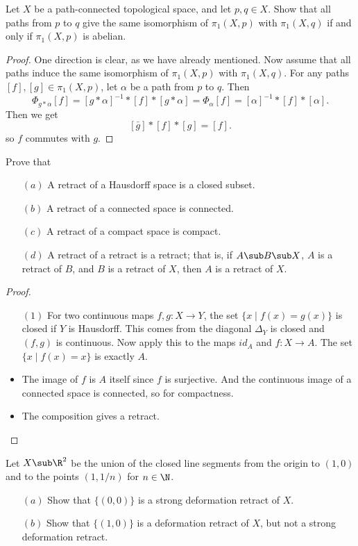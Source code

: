 \begin{exercise}
Let $X$ be a path-connected topological space, and let $p,q\in X$. Show that
all paths from $p$ to $q$ give the same isomorphism of $\pi_1(X,p)$ with $\pi_1(X,q)$ if and only if $\pi_1(X,p)$ is abelian.
\end{exercise}
\begin{proof}
One direction is clear, as we have already mentioned. Now assume that all paths induce the same isomorphism of $\pi_1(X,p)$ with $\pi_1(X,q)$. For any paths $[f],[g]\in\pi_1(X,p)$, let $\alpha$ be a path from $p$ to $q$. Then
\[\varPhi_{g\ast\alpha}[f]=[g\ast\alpha]^{-1}\ast[f]\ast[g\ast\alpha]=\varPhi_\alpha[f]=[\alpha]^{-1}\ast[f]\ast[\alpha].\]
Then we get
\[[\bar{g}]\ast[f]\ast[g]=[f].\]
so $f$ commutes with $g$.
\end{proof}
\begin{exercise}
Prove that
\begin{itemize}
\item[$(a)$] A retract of a Hausdorff space is a closed subset.
\item[$(b)$] A retract of a connected space is connected.
\item[$(c)$] A retract of a compact space is compact.
\item[$(d)$] A retract of a retract is a retract; that is, if $A\sub B\sub X$, $A$ is a retract of $B$, and $B$ is a retract of $X$, then $A$ is a retract of $X$.
\end{itemize} 
\end{exercise}
\begin{proof}
\mbox{}
\begin{itemize}
\item[$(1)$] For two continuous maps $f,g:X\to Y$, the set $\{x\mid f(x)=g(x)\}$ is closed if $Y$ is Hausdorff. This comes from the diagonal $\Delta_Y$ is closed and $(f,g)$ is continuous. Now apply this to the maps $id_A$ and $f:X\to A$. The set $\{x\mid f(x)=x\}$ is exactly $A$.
\item The image of $f$ is $A$ itself since $f$ is surjective. And the continuous image of a connected space is connected, so for compactness.
\item The composition gives a retract. 
\end{itemize}
\end{proof}
\begin{exercise}
Let $X\sub\R^2$ be the union of the closed line segments from the origin
to $(1,0)$ and to the points $(1,1/n)$ for $n\in\N$.
\begin{itemize}
\item[$(a)$] Show that $\{(0,0)\}$ is a strong deformation retract of $X$.
\item[$(b)$] Show that $\{(1,0)\}$ is a deformation retract of $X$, but not a strong deformation retract.
\end{itemize}
\end{exercise}
